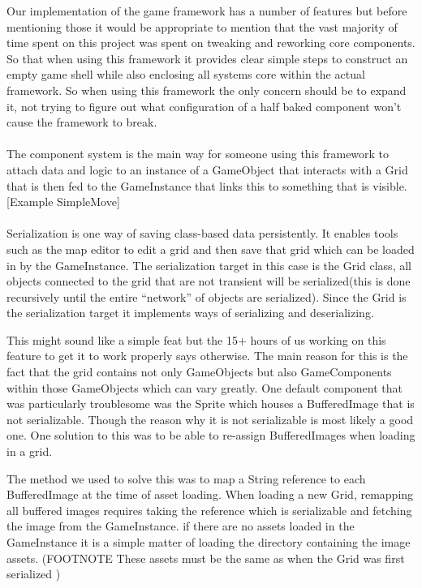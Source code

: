\documentclass[main.tex]{subfiles}
\begin{document}
Our implementation of the game framework has a number of features but before mentioning those it would be appropriate to mention that the vast majority of time spent on this project was spent on tweaking and reworking core components. So that when using this framework it provides clear simple steps to construct an empty game shell while also enclosing all systems core within the actual framework. So when using this framework the only concern should be to expand it, not trying to figure out what configuration of a half baked component won’t cause the framework to break.
\\ \\
[Component system]
The component system is the main way for someone using this framework to attach data and logic to an instance of a GameObject that interacts with a Grid that is then fed to the GameInstance that links this to something that is visible.
[Example SimpleMove]
\\ \\
[Serialization]
Serialization is one way of saving class-based data persistently.  It enables tools such as the map editor to edit a grid and then save that grid which can be loaded in by the GameInstance. The serialization target in this case is the Grid class, all objects connected to the grid that are not transient will be serialized(this is done recursively until the entire “network”  of objects are serialized). Since the Grid is the serialization target it  implements ways of serializing and deserializing. 

This might sound like a simple feat but the 15+ hours of us working on this feature to get it to work properly says otherwise. The main reason for this is the fact that the grid contains not only GameObjects but also GameComponents within those GameObjects which can vary greatly. One default component that was particularly troublesome was the Sprite which houses a BufferedImage that is not serializable. Though the reason why it is not serializable is most likely a good one. One solution to this was to be able to re-assign BufferedImages when loading in a grid. 

The method we used to solve this was to map a String reference to each BufferedImage at the time of asset loading. When loading a new Grid, remapping all buffered images requires taking the reference which is serializable and fetching the image from the GameInstance. if there are no assets loaded in the GameInstance it is a simple matter of loading the directory containing the image assets. (FOOTNOTE These assets must be the same as when the Grid was first serialized )
\end{document}
